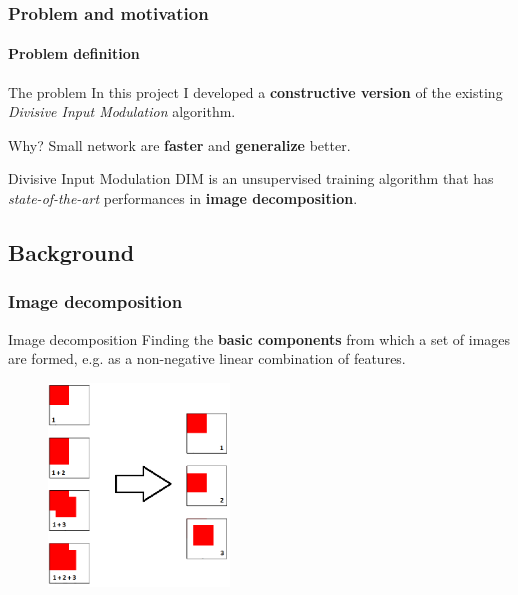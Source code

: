 \documentclass{beamer}
\begin{document}
			\begin{frame}
				\frametitle{Problem and motivation}
				\framesubtitle{Problem definition}
				\begin{exampleblock}{The problem}
					In this project I developed a \textbf{constructive version} of the existing \emph{Divisive Input Modulation} algorithm.
				\end{exampleblock}
				\begin{block}{Why?}
					Small network are \textbf{faster} and \textbf{generalize} better.
				\end{block}
				\begin{block}{Divisive Input Modulation}
					DIM is an unsupervised training algorithm that has \emph{state-of-the-art} performances in \textbf{image decomposition}.
				\end{block}
			\end{frame}
		
		
		\subsection{Background}
			\begin{frame}
				\frametitle{Image decomposition}
				\begin{block}{Image decomposition}
					Finding the \textbf{basic components} from which a set of images are formed, e.g. as a non-negative linear combination of features.
				\end{block}
				\begin{figure}[h]
					\centering
					\includegraphics[width=0.43\textwidth]{decomposition}
				\end{figure}
			\end{frame}
			
\end{document}

